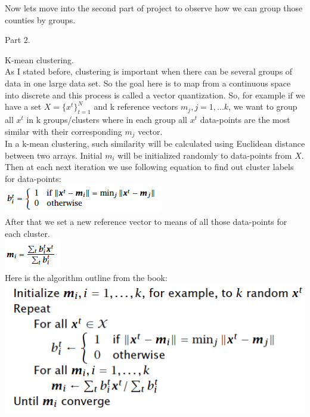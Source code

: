 \documentclass[12pt, letterpaper]{article}
\begin{document}
\begin{enumerate}[label=\Roman*.]
	Now lets move into the second part of project to observe how we can group those counties by groups.
	{\bf \item Part 2.} K-mean clustering. \\
	
	As I stated before, clustering is important when there can be several groups of data in one large data set. So the goal here is to map from a continuous space into discrete and this process is  called  a vector quantization. So, for example if we have a set \(X = \{x^t\}_{t=1}^N \) and k reference vectors \( m_j, j=1,...k \), we want to group all \(x^t \) in k groups/clusters where in each group all \(x^t \) data-points are the most similar with their corresponding \(m_j\) vector.\\ 
	 In a k-mean clustering, such similarity will be calculated using Euclidean distance between two arrays. Initial \(m_i\) will be initialized randomly to data-points from \(X\). Then at each next iteration we use following equation to find out cluster labels for data-points:\\
	 \includegraphics[scale=0.83]{2.png} \\
	 After that we set a new reference vector to means of all those data-points for each cluster.\\
	  \includegraphics[scale=0.83]{3.png} \\
	  Here is the algorithm outline from the book:\\
	  
	   \includegraphics[scale=0.55]{5.png} \\
	  

\end{enumerate}
\end{document}
